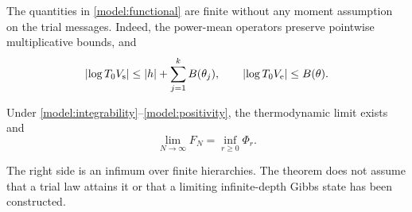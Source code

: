 The quantities in \eqref{model:functional} are finite without any moment
assumption on the trial messages. Indeed, the power-mean operators preserve
pointwise multiplicative bounds, and
\begin{equation}\label{model:trial-bounds}
 \lvert\log T_0V_{\rm s}\rvert\le\lvert h\rvert+\sum_{j=1}^k B(\theta_j),
 \qquad \lvert\log T_0V_{\rm e}\rvert\le B(\theta).
\end{equation}

\begin{theorem}\label{main:theorem}
Under \eqref{model:integrability}--\eqref{model:positivity}, the thermodynamic
limit exists and
\begin{equation}\label{main:formula}
 \lim_{N\to\infty}F_N=\inf_{r\ge0}\Phi_r.
\end{equation}
\end{theorem}

The right side is an infimum over finite hierarchies. The theorem does not
assume that a trial law attains it or that a limiting infinite-depth
Gibbs state has been constructed.
